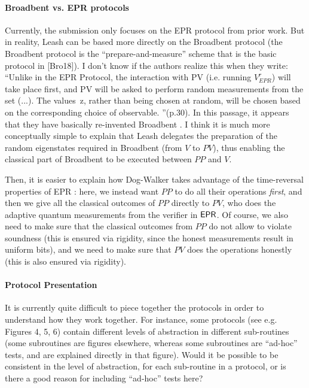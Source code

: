 \documentclass[12pt]{article}
\newcommand{\DW}{{\sf Dog-Walker }}
\newcommand{\Leash}{{\sf Leash }}
\newcommand{\Broad}{{\sf Broadbent }}
\newcommand{\EPR}{{\sf EPR }}
\begin{document}
\paragraph{\Broad vs. \EPR protocols}
\label{sec:broad-EPR}
Currently, the submission only focuses on the \EPR protocol from prior work. But in reality, \Leash can be based more directly on the \Broad protocol (the \Broad protocol is the ``prepare-and-measure'' scheme that is the basic protocol in [Bro18]). I don't know if the authors realize this when they write: ``Unlike in the EPR Protocol,
the interaction with PV (i.e. running $V^r_{EPR}$) will take place first, and PV will be asked to perform random
measurements from the set (...). The values~z, rather than being chosen at random, will be
chosen based on the corresponding choice of observable. ''(p.30). In this passage, it appears that they have basically re-invented \Broad. I think it is much more conceptually simple to explain that \Leash delegates the preparation of the random eigenstates required in \Broad (from $V$ to $PV$), thus enabling the classical part of \Broad to be executed between $PP$ and $V$.

Then, it is easier to explain how \DW takes advantage of the time-reversal properties of \EPR: here, we instead want $PP$ to do all their operations \emph{first}, and then we give all the classical outcomes of $PP$ directly to $PV$, who does the adaptive quantum measurements from the verifier in $\EPR$. Of course, we also need to make sure that the classical outcomes from $PP$ do not allow to violate soundness (this is ensured via rigidity, since the honest measurements result in uniform bits), and we need to make sure that $PV$ does the operations honestly (this is also ensured via rigidity).

\paragraph{Protocol Presentation}

It is currently quite difficult to piece together the protocols in order to understand how they work together. For instance, some protocols (see e.g. Figures 4, 5, 6) contain different levels of abstraction in different sub-routines (some subroutines are figures elsewhere, whereas some subroutines are ``ad-hoc'' tests, and are explained directly in that figure). Would it be possible to be consistent in the level of abstraction, for each sub-routine in a protocol, or is there a good reason for including ``ad-hoc'' tests here?
\end{document}
